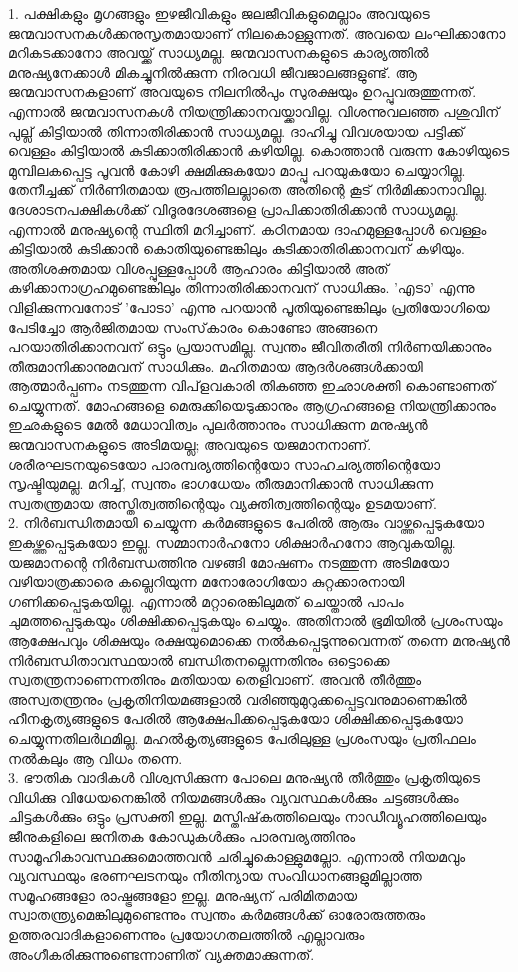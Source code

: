 1. പക്ഷികളും മൃഗങ്ങളും ഇഴജീവികളും ജലജീവികളുമെല്ലാം അവയുടെ ജന്മവാസനകള്‍ക്കനുസൃതമായാണ് നിലകൊള്ളുന്നത്. അവയെ ലംഘിക്കാനോ മറികടക്കാനോ അവയ്ക്ക് സാധ്യമല്ല. ജന്മവാസനകളുടെ കാര്യത്തില്‍ മനുഷ്യനേക്കാള്‍ മികച്ചുനില്‍ക്കുന്ന നിരവധി ജീവജാലങ്ങളുണ്ട്. ആ ജന്മവാസനകളാണ് അവയുടെ നിലനില്‍പും സുരക്ഷയും ഉറപ്പുവരുത്തുന്നത്. എന്നാല്‍ ജന്മവാസനകള്‍ നിയന്ത്രിക്കാനവയ്ക്കാവില്ല. വിശന്നുവലഞ്ഞ പശുവിന് പുല്ല് കിട്ടിയാല്‍ തിന്നാതിരിക്കാന്‍ സാധ്യമല്ല. ദാഹിച്ചു വിവശയായ പട്ടിക്ക് വെള്ളം കിട്ടിയാല്‍ കുടിക്കാതിരിക്കാന്‍ കഴിയില്ല. കൊത്താന്‍ വരുന്ന കോഴിയുടെ മുമ്പിലകപ്പെട്ട പൂവന്‍ കോഴി ക്ഷമിക്കുകയോ മാപ്പു പറയുകയോ ചെയ്യാറില്ല. തേനീച്ചക്ക് നിര്‍ണിതമായ രൂപത്തിലല്ലാതെ അതിന്റെ കൂട് നിര്‍മിക്കാനാവില്ല. ദേശാടനപക്ഷികള്‍ക്ക് വിദൂരദേശങ്ങളെ പ്രാപിക്കാതിരിക്കാന്‍ സാധ്യമല്ല. എന്നാല്‍ മനുഷ്യന്റെ സ്ഥിതി മറിച്ചാണ്. കഠിനമായ ദാഹമുള്ളപ്പോള്‍ വെള്ളം കിട്ടിയാല്‍ കുടിക്കാന്‍ കൊതിയുണ്ടെങ്കിലും കുടിക്കാതിരിക്കാനവന് കഴിയും. അതിശക്തമായ വിശപ്പുള്ളപ്പോള്‍ ആഹാരം കിട്ടിയാല്‍ അത് കഴിക്കാനാഗ്രഹമുണ്ടെങ്കിലും തിന്നാതിരിക്കാനവന് സാധിക്കും. 'എടാ' എന്നു വിളിക്കുന്നവനോട് 'പോടാ' എന്നു പറയാന്‍ പൂതിയുണ്ടെങ്കിലും പ്രതിയോഗിയെ പേടിച്ചോ ആര്‍ജിതമായ സംസ്‌കാരം കൊണ്ടോ അങ്ങനെ പറയാതിരിക്കാനവന് ഒട്ടും പ്രയാസമില്ല. സ്വന്തം ജീവിതരീതി നിര്‍ണയിക്കാനും തീരുമാനിക്കാനുമവന് സാധിക്കും. മഹിതമായ ആദര്‍ശങ്ങള്‍ക്കായി ആത്മാര്‍പ്പണം നടത്തുന്ന വിപ്‌ളവകാരി തികഞ്ഞ ഇഛാശക്തി കൊണ്ടാണത് ചെയ്യുന്നത്. മോഹങ്ങളെ മെരുക്കിയെടുക്കാനും ആഗ്രഹങ്ങളെ നിയന്ത്രിക്കാനും ഇഛകളുടെ മേല്‍ മേധാവിത്വം പുലര്‍ത്താനും സാധിക്കുന്ന മനുഷ്യന്‍ ജന്മവാസനകളുടെ അടിമയല്ല; അവയുടെ യജമാനനാണ്. ശരീരഘടനയുടെയോ പാരമ്പര്യത്തിന്റെയോ സാഹചര്യത്തിന്റെയോ സൃഷ്ടിയുമല്ല. മറിച്ച്, സ്വന്തം ഭാഗധേയം തീരുമാനിക്കാന്‍ സാധിക്കുന്ന സ്വതന്ത്രമായ അസ്തിത്വത്തിന്റെയും വ്യക്തിത്വത്തിന്റെയും ഉടമയാണ്.\\
2. നിര്‍ബന്ധിതമായി ചെയ്യുന്ന കര്‍മങ്ങളുടെ പേരില്‍ ആരും വാഴ്ത്തപ്പെടുകയോ ഇകഴ്ത്തപ്പെടുകയോ ഇല്ല. സമ്മാനാര്‍ഹനോ ശിക്ഷാര്‍ഹനോ ആവുകയില്ല. യജമാനന്റെ നിര്‍ബന്ധത്തിനു വഴങ്ങി മോഷണം നടത്തുന്ന അടിമയോ വഴിയാത്രക്കാരെ കല്ലെറിയുന്ന മനോരോഗിയോ കുറ്റക്കാരനായി ഗണിക്കപ്പെടുകയില്ല. എന്നാല്‍ മറ്റാരെങ്കിലുമത് ചെയ്താല്‍ പാപം ചുമത്തപ്പെടുകയും ശിക്ഷിക്കപ്പെടുകയും ചെയ്യും. അതിനാല്‍ ഭൂമിയില്‍ പ്രശംസയും ആക്ഷേപവും ശിക്ഷയും രക്ഷയുമൊക്കെ നല്‍കപ്പെടുന്നുവെന്നത് തന്നെ മനുഷ്യന്‍ നിര്‍ബന്ധിതാവസ്ഥയാല്‍ ബന്ധിതനല്ലെന്നതിനും ഒട്ടൊക്കെ സ്വതന്ത്രനാണെന്നതിനും മതിയായ തെളിവാണ്. അവന്‍ തീര്‍ത്തും അസ്വതന്ത്രനും പ്രകൃതിനിയമങ്ങളാല്‍ വരിഞ്ഞുമുറുക്കപ്പെട്ടവനുമാണെങ്കില്‍ ഹീനകൃത്യങ്ങളുടെ പേരില്‍ ആക്ഷേപിക്കപ്പെടുകയോ ശിക്ഷിക്കപ്പെടുകയോ ചെയ്യുന്നതിലര്‍ഥമില്ല. മഹല്‍കൃത്യങ്ങളുടെ പേരിലുള്ള പ്രശംസയും പ്രതിഫലം നല്‍കലും ആ വിധം തന്നെ.\\
3. ഭൗതിക വാദികള്‍ വിശ്വസിക്കുന്ന പോലെ മനുഷ്യന്‍ തീര്‍ത്തും പ്രകൃതിയുടെ വിധിക്കു വിധേയനെങ്കില്‍ നിയമങ്ങള്‍ക്കും വ്യവസ്ഥകള്‍ക്കും ചട്ടങ്ങള്‍ക്കും ചിട്ടകള്‍ക്കും ഒട്ടും പ്രസക്തി ഇല്ല. മസ്തിഷ്‌കത്തിലെയും നാഡീവ്യൂഹത്തിലെയും ജീനുകളിലെ ജനിതക കോഡുകള്‍ക്കും പാരമ്പര്യത്തിനും സാമൂഹികാവസ്ഥക്കുമൊത്തവന്‍ ചരിച്ചുകൊള്ളുമല്ലോ. എന്നാല്‍ നിയമവും വ്യവസ്ഥയും ഭരണഘടനയും നീതിന്യായ സംവിധാനങ്ങളുമില്ലാത്ത സമൂഹങ്ങളോ രാഷ്ട്രങ്ങളോ ഇല്ല. മനുഷ്യന് പരിമിതമായ സ്വാതന്ത്യ്രമെങ്കിലുമുണ്ടെന്നും സ്വന്തം കര്‍മങ്ങള്‍ക്ക് ഓരോരുത്തരും ഉത്തരവാദികളാണെന്നും പ്രയോഗതലത്തില്‍ എല്ലാവരും അംഗീകരിക്കുന്നുണ്ടെന്നാണിത് വ്യക്തമാക്കുന്നത്.\\
